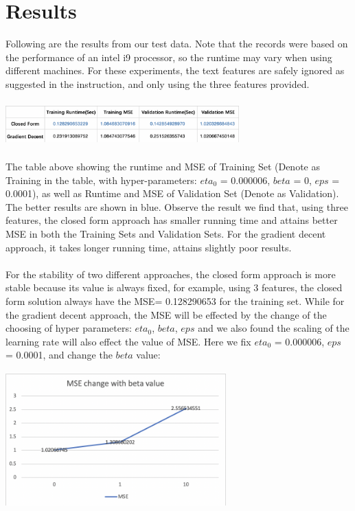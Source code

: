 \documentclass[11pt]{article}
\begin{document}
\section{Results}
Following are the results from our test data. Note that the records were based on the performance of an intel i9 processor, so the runtime may vary when using different machines.  For these experiments, the text features are safely ignored as suggested in the instruction, and only using the three features provided.\\
\\
\includegraphics[width=9cm, height=1.5cm]{runtime.png}\\
\\
The table above showing the runtime and MSE of Training Set (Denote as Training in the table, with hyper-parameters: $eta_0$ = 0.000006, $beta$ = 0, $eps$ = 0.0001),  as well as Runtime and MSE of Validation Set (Denote as Validation). The better results are shown in blue. Observe the result we find that, using three features, the closed form approach has smaller running time and attains better MSE in both the Training Sets and Validation Sets. For the gradient decent approach, it takes longer running time, attains slightly poor results. \\
\\
For the stability of two different approaches, the closed form approach is more stable because its value is always fixed, for example, using 3 features, the closed form solution always have the MSE= 0.128290653 for the training set. While for the gradient decent approach, the MSE will be effected by the change of the choosing of hyper parameters: $eta_0$, $beta$, $eps$ and we also found the scaling of the learning rate will also effect the value of MSE.
\newpage
Here we fix $eta_0$ = 0.000006, $eps$ = 0.0001, and change the $beta$ value:\\ 
\includegraphics[width=8.5cm, height=6cm]{beta.png}\\
\end{document}
